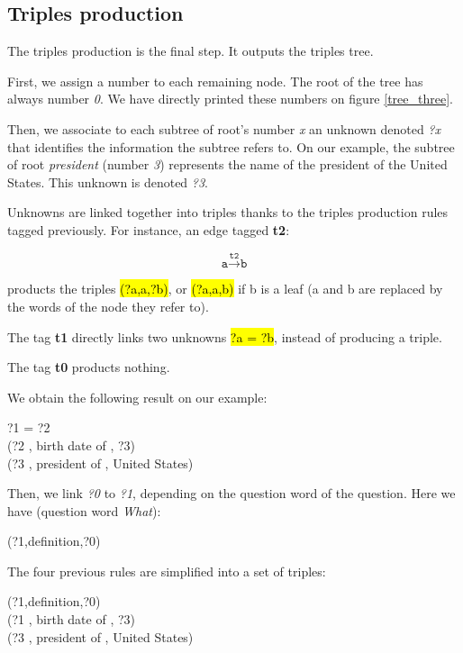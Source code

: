 
\subsection{Triples production}

The triples production is the final step. It outputs the triples tree.

First, we assign a number to each remaining node. The root of the tree has always number \textit{0}. We have directly printed these numbers on figure \ref{tree_three}.

Then, we associate to each subtree of root's number \textit{x} an unknown denoted \textit{?x} that identifies the information the subtree refers to. On our example, the subtree of root \textit{president} (number \textit{3}) represents the name of the president of the United States. This unknown is denoted \textit{?3}.

Unknowns are linked together into triples thanks to the triples production rules tagged previously. For instance, an  edge tagged \textbf{t2}:

\[\texttt{a}\xrightarrow{\texttt{t2}}\texttt{b}\]

products the triples \hl{(?a,a,?b)}, or \hl{(?a,a,b)} if b is a leaf (a and b are replaced by the words of the node they refer to).

The tag \textbf{t1} directly links two unknowns \hl{?a = ?b}, instead of producing a triple.

The tag \textbf{t0} products nothing.

We obtain the following result on our example:

\begin{center}
 ?1 = ?2 ~\\
 (?2 , birth date of , ?3) ~\\
 (?3 , president of , United States)
\end{center}

Then, we link \textit{?0} to \textit{?1}, depending on the question word of the question. Here we have (question word \textit{What}):
\begin{center}
 (?1,definition,?0)
\end{center}

The four previous rules are simplified into a set of triples:

\begin{center}
 (?1,definition,?0) ~\\
 (?1 , birth date of , ?3) ~\\
 (?3 , president of , United States)
\end{center}

